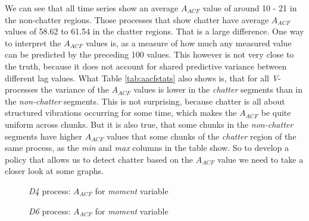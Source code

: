 \documentclass[12 pt]{scrartcl}
\begin{document}
We can see that all time series show an average $A_{ACF}$ value of around 10 - 21 in the non-chatter regions. Those processes that show chatter have average $A_{ACF}$ values of 58.62 to 61.54 in the chatter regions. That is a large difference. One way to interpret the $A_{ACF}$ values is, as a measure of how much any measured value can be predicted by the preceding 100 values. This however is not very close to the truth, because it does not account for shared predictive variance between different lag values. What Table \ref{tab:aacfstats} also shows is, that for all \emph{V}-processes the variance of the $A_{ACF}$ values is lower in the \emph{chatter} segments than in the \emph{non-chatter} segments. This is not surprising, because chatter is all about structured vibrations occurring for some time, which makes the $A_{ACF}$ be quite uniform across chunks.
But it is also true, that some chunks in the \emph{non-chatter} segments have higher $A_{ACF}$ values that some chunks of the \emph{chatter} region of the same process, as the \emph{min} and \emph{max} columns in the table show. So to develop a policy that allows us to detect chatter based on the $A_{ACF}$ value we need to take a closer look at some graphs.

\begin{figure}[p]
  \caption{\emph{D4} process: $A_{ACF}$ for \emph{moment} variable}
  \label{fig:d4-moment-aacf}
\end{figure}


\begin{figure}[p]
  \caption{\emph{D6} process: $A_{ACF}$ for \emph{moment} variable}
  \label{fig:d6-moment-aacf}
\end{figure}
\end{document}
